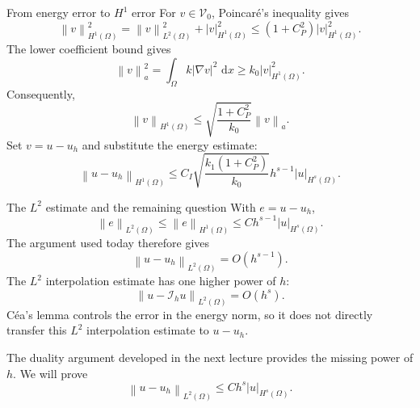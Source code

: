 \documentclass[11pt,aspectratio=169]{beamer}
\newcommand{\dd}{\,\mathrm{d}}
\newcommand{\Om}{\Omega}
\newcommand{\Vzero}{\mathcal V_0}
\newcommand{\Ih}{\mathcal I_h}
\newcommand{\norm}[2][]{\left\lVert#2\right\rVert_{#1}}
\newcommand{\seminorm}[2][]{\left\lvert#2\right\rvert_{#1}}
\begin{document}
\begin{frame}{From energy error to \texorpdfstring{$H^1$}{H1} error}
For $v\in\Vzero$, Poincar\'e's inequality gives
\[
  \norm[H^1(\Om)]{v}^2
  =\norm[L^2(\Om)]{v}^2+\seminorm[H^1(\Om)]{v}^2
  \leq(1+C_P^2)\seminorm[H^1(\Om)]{v}^2.
\]
The lower coefficient bound gives
\[
  \norm[a]{v}^2
  =\int_\Om k|\nabla v|^2\,\dd x
  \geq k_0\seminorm[H^1(\Om)]{v}^2.
\]
Consequently,
\[
  \norm[H^1(\Om)]{v}
  \leq\sqrt{\frac{1+C_P^2}{k_0}}\norm[a]{v}.
\]
Set $v=u-u_h$ and substitute the energy estimate:
\[
  \boxed{\norm[H^1(\Om)]{u-u_h}
  \leq C_I\sqrt{\frac{k_1(1+C_P^2)}{k_0}}
  h^{s-1}\seminorm[H^s(\Om)]{u}.}
\]
\end{frame}

\begin{frame}{The \texorpdfstring{$L^2$}{L2} estimate and the remaining question}
With $e=u-u_h$,
\[
  \norm[L^2(\Om)]{e}
  \leq \norm[H^1(\Om)]{e}
  \leq C h^{s-1}\seminorm[H^s(\Om)]{u}.
\]
The argument used today therefore gives
\[
  \boxed{
  \norm[L^2(\Om)]{u-u_h}
  =O(h^{s-1}).}
\]
The $L^2$ interpolation estimate has one higher power of $h$:
\[
  \boxed{\norm[L^2(\Om)]{u-\Ih u}=O(h^s).}
\]
C\'ea's lemma controls the error in the energy norm, so it does not directly
transfer this $L^2$ interpolation estimate to $u-u_h$.

The duality argument developed in the next lecture provides the missing power
of $h$. We will prove
\[
  \boxed{\norm[L^2(\Om)]{u-u_h}\leq C h^s
  \seminorm[H^s(\Om)]{u}.}
\]
\end{frame}
\end{document}
